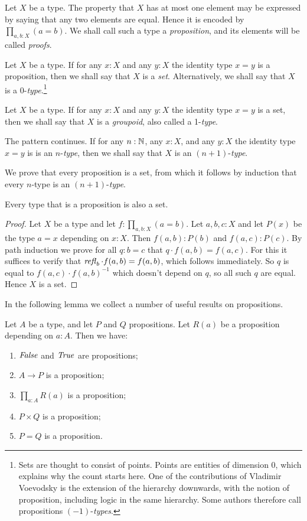 Let $X$ be a type.  The property that $X$ has at most one element may be expressed by saying that any two elements are equal. Hence it is encoded
by $\prod_{a,b:X} (a=b)$.  We shall call such a type a \emph{proposition}, and its elements will be called \emph{proofs}.

Let $X$ be a type.  If for any $x:X$ and any $y:X$ the identity type $x=y$ is a proposition, then we shall say that $X$ is a \emph{set}.
Alternatively, we shall say that $X$ is a 0-\emph{type}.\footnote{%
Sets are thought to consist of points. Points are entities of dimension 0, 
which explains why the count starts here.
One of the contributions of Vladimir Voevodsky is the extension of
the hierarchy downwards, with the notion of proposition,
including logic in the same hierarchy.
Some authors therefore call propositions $(-1)$-\emph{types}.} 

Let $X$ be a type.  If for any $x:X$ and any $y:X$ the identity type $x=y$ is a set, 
 then we shall say that $X$ is a \emph{groupoid}, also called a 1-\emph{type}.

The pattern continues.  If for any $n:\mathbb{N}$, any $x:X$, and any $y:X$ 
the identity type $x=y$ is is an $n$-\emph{type}, 
then we shall say that $X$ is an $(n+1)$-\emph{type}.

We prove that every proposition is a set, from which it follows
by induction that every $n$-type is an $(n+1)$-\emph{type}.

\begin{lemma}\label{lem:prop_is_set}
Every type that is a proposition is also a set.
\end{lemma}
\begin{proof}
Let $X$ be a type and let $f: \prod_{a,b:X} (a=b)$. Let $a,b,c : X$ and
let $P(x)$ be the type $a=x$ depending on $x:X$. Then
$f(a,b):P(b)$ and $f(a,c):P(c)$. By path induction we prove for
all $q:b=c$ that $q\cdot f(a,b) = f(a,c)$. For this it suffices to
verify that $\mathop{{\it refl}_{b}} \cdot f(a,b) = f(a,b)$, which follows immediately.
So $q$ is equal to $f(a,c)\cdot f(a,b)^{-1}$ which doesn't
depend on $q$, so all such $q$ are equal. Hence $X$ is a set.
\end{proof}

In the following lemma we collect a number of useful results on propositions.

\begin{lemma}\label{lem:prop_utils}
Let $A$ be a type, and let $P$ and $Q$ propositions.
Let $R(a)$ be a proposition depending on $a:A$. Then we have:
\begin{enumerate}
\item\label{prop_utils_false_true} $\mathop{\mathit{False}}$ and $\mathop{\mathit{True}}$ are propositions;
\item\label{prop_utils_implication} $A\to P$ is a proposition;
\item\label{prop_utils_pi} $\prod_{a:A} R(a)$ is a proposition;
\item\label{prop_utils_times} $P\times Q$ is a proposition;
\item\label{prop_utils_eq} $P = Q$ is a proposition.
\end{enumerate}
\end{lemma}


